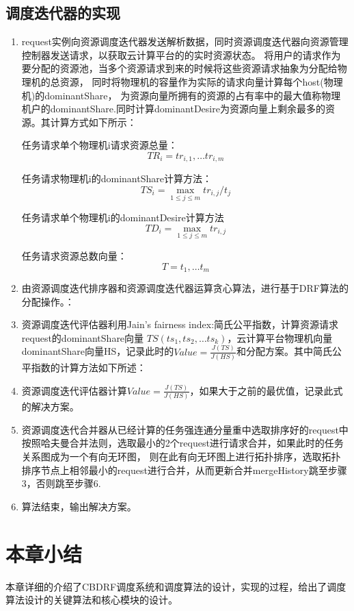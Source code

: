 \subsection{调度迭代器的实现}
\begin{enumerate}
\item request实例向资源调度迭代器发送解析数据，同时资源调度迭代器向资源管理控制器发送请求，以获取云计算平台的的实时资源状态。
将用户的请求作为要分配的资源池，当多个资源请求到来的时候将这些资源请求抽象为分配给物理机的总资源，
同时将物理机的容量作为实际的请求向量计算每个host(物理机)的dominantShare，
为资源向量所拥有的资源的占有率中的最大值称物理机户的dominantShare.同时计算dominantDesire为资源向量上剩余最多的资源。其计算方式如下所示：

任务请求单个物理机i请求资源总量：
\begin{equation}
{TR}_{i}={tr}_{i,1},…{tr}_{i,m}
\end{equation}

任务请求物理机i的dominantShare计算方法：
\begin{equation}
{TS}_{i}=\max \limits_{1 \leq j \leq m} {{tr}_{i,j}}/{{t}_{j}}
\end{equation}

任务请求单个物理机i的dominantDesire计算方法
\begin{equation}
{TD}_{i}=\max \limits_{1 \leq j \leq m} {tr}_{i,j}
\end{equation}

任务请求资源总数向量：
\begin{equation}
T={t}_{1},…{t}_{m}
\end{equation}
\item 由资源调度迭代排序器和资源调度迭代器运算贪心算法，进行基于DRF算法的分配操作。：
\item 资源调度迭代评估器利用Jain’s fairness index:简氏公平指数，计算资源请求request的dominantShare向量
$TS\left({ts}_{1},{ts}_{2},…{ts}_{k}\right )$，云计算平台物理机向量dominantShare向量HS，记录此时的$Value = \frac{J(TS)}{J(HS)}$和分配方案。其中简氏公平指数的计算方法如下所述：
\item 资源调度迭代评估器计算$Value = \frac{J(TS)}{J(HS)}$，如果大于之前的最优值，记录此式的解决方案。
\item 资源调度迭代合并器从已经计算的任务强连通分量重中选取排序好的request中按照哈夫曼合并法则，选取最小的2个request进行请求合并，如果此时的任务关系图成为一个有向无环图，
则在此有向无环图上进行拓扑排序，选取拓扑排序节点上相邻最小的request进行合并，从而更新合并mergeHistory跳至步骤3，否则跳至步骤6.
\item 算法结束，输出解决方案。
\end{enumerate}

\section{本章小结}
本章详细的介绍了CBDRF调度系统和调度算法的设计，实现的过程，给出了调度算法设计的关键算法和核心模块的设计。